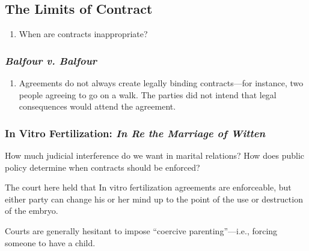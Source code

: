 \subsection{The Limits of Contract}

\begin{enumerate}
    \item When are contracts inappropriate?
\end{enumerate}

\subsubsection{\emph{Balfour v. Balfour}}

\begin{enumerate}
    \item Agreements do not always create legally binding contracts---for 
    instance, two people agreeing to go on a walk. The parties did not intend 
    that legal consequences would attend the agreement.
\end{enumerate}

\subsubsection{In Vitro Fertilization: \emph{In Re the Marriage of Witten}}

How much judicial interference do we want in marital relations? How does 
public policy determine when contracts should be enforced?

The court here held that In vitro fertilization agreements are enforceable, 
but either party can change his or her mind up to the point of the use or 
destruction of the embryo.

Courts are generally hesitant to impose ``coercive parenting''---i.e., forcing 
someone to have a child.

